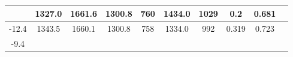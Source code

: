 \documentclass[a4paper,12pt]{article}
\begin{document}
\begin{longtable}{
     |
%    
    c|
%    
    c|
%    
    c|
%    
    c|
%    
    c|
%    
    c|
%    
    c|
%    
    c|
%    
    c|
%    
    c|
%    
    }
%        
        & 1327.0
%        

%        

%        
        & 1661.6
%        

%        

%        
        & 1300.8
%        

%        

%        
        & 760
%        

%        

%        
        & 1434.0
%        

%        

%        
        & 1029
%        

%        

%        
        & 0.2
%        

%        

%        
        & 0.681
%        

%        
        \\
        \hline

        

%        

%        
        -12.4
%        

%        

%        
        & 1343.5
%        

%        

%        
        & 1660.1
%        

%        

%        
        & 1300.8
%        

%        

%        
        & 758
%        

%        

%        
        & 1334.0
%        

%        

%        
        & 992
%        

%        

%        
        & 0.319
%        

%        

%        
        & 0.723
%        

%        
        \\
        \hline

        

%        

%        
        -9.4
%        

%        


\end{longtable}
\end{document}
